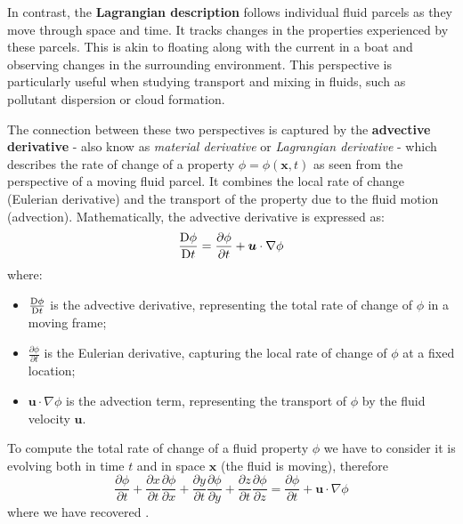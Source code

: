 In contrast, the \textbf{Lagrangian description} follows individual fluid parcels as they move through space and time.
It tracks changes in the properties experienced by these parcels.
This is akin to floating along with the current in a boat and observing changes in the surrounding environment.
This perspective is particularly useful when studying transport and mixing in fluids, such as pollutant dispersion or cloud formation.

The connection between these two perspectives is captured by the \textbf{advective derivative} - also know as \emph{material derivative} or
\emph{Lagrangian derivative} - which describes the rate of change of a property $\phi= \phi(\bm{x},t)$ as seen from the perspective of a moving fluid parcel.
It combines the local rate of change (Eulerian derivative) and the transport of the property due to the fluid motion (advection).
Mathematically, the advective derivative is expressed as:
\begin{equation}
	\frac{\mathrm{D} \phi}{\mathrm{D}t} = \frac{\partial \phi}{\partial t} + \bm{u} \cdot \nabla \phi
	\label{eq:material-derivative}
\end{equation}
where:
\begin{itemize}
	\item $\frac{\mathrm{D} \phi}{\mathrm{D}t}$ is the advective derivative, representing the total rate of change of $\phi$ in a moving frame;
	\item $\frac{\partial \phi}{\partial t}$ is the Eulerian derivative, capturing the local rate of change of $\phi$ at a fixed location;
	\item $\bm{u} \cdot \nabla \phi$ is the advection term, representing the transport of $\phi$ by the fluid velocity $\bm{u}$.
\end{itemize}
\begin{pf}{
		To compute the total rate of change of a fluid property $\phi$ we have to consider it is
		evolving both in time $t$ and in space $\bm{x}$ (the fluid is moving), therefore
		\begin{equation}
			\frac{\partial \phi}{\partial t} + \frac{\partial x}{\partial t}\frac{\partial \phi}{\partial x} + \frac{\partial y}{\partial t}\frac{\partial \phi}{\partial y}+\frac{\partial z}{\partial t}\frac{\partial \phi}{\partial z} = \frac{\partial \phi}{\partial t} + \bm{u}\cdot\nabla\phi
			\label{eq:total-derivative}
		\end{equation}
		where we have recovered \eq{\ref{eq:material-derivative}}.
	}
\end{pf}


